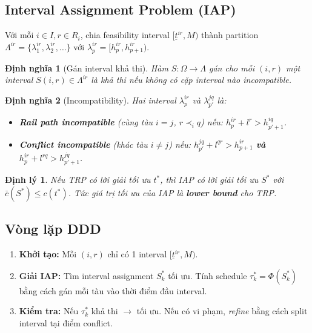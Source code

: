 \documentclass[11pt,a4paper]{article}
\newtheorem{definition}{Định nghĩa}
\newtheorem{theorem}{Định lý}
\begin{document}
\subsection{Interval Assignment Problem (IAP)}

Với mỗi $i \in I, r \in R_i$, chia feasibility interval $[\underline{t}^{ir}, M)$ thành partition $\Lambda^{ir} = \{\lambda_1^{ir}, \lambda_2^{ir}, \ldots\}$ với $\lambda_p^{ir} = [h_p^{ir}, h_{p+1}^{ir})$.

\begin{definition}[Gán interval khả thi]
Hàm $S: \Omega \to \Lambda$ gán cho mỗi $(i,r)$ một interval $S(i,r) \in \Lambda^{ir}$ là \emph{khả thi} nếu không có cặp interval nào incompatible.
\end{definition}

\begin{definition}[Incompatibility]
Hai interval $\lambda_p^{ir}$ và $\lambda_{p'}^{jq}$ là:
\begin{itemize}
  \item \textbf{Rail path incompatible} (cùng tàu $i=j$, $r \prec_i q$) nếu: $h_p^{ir} + l^r > h_{p'+1}^{iq}$.
  \item \textbf{Conflict incompatible} (khác tàu $i \neq j$) nếu: $h_{p'}^{jq} + l^{qr} > h_{p+1}^{ir}$ \textbf{và} $h_p^{ir} + l^{rq} > h_{p'+1}^{jq}$.
\end{itemize}
\end{definition}

\begin{theorem}
Nếu TRP có lời giải tối ưu $t^*$, thì IAP có lời giải tối ưu $S^*$ với $\bar{c}(S^*) \leq c(t^*)$. Tức giá trị tối ưu của IAP là \textbf{lower bound} cho TRP.
\end{theorem}

\subsection{Vòng lặp DDD}

\begin{enumerate}
  \item \textbf{Khởi tạo:} Mỗi $(i,r)$ chỉ có 1 interval $[\underline{t}^{ir}, M)$.
  \item \textbf{Giải IAP:} Tìm interval assignment $S_k^*$ tối ưu. Tính schedule $\tau_k^* = \Phi(S_k^*)$ bằng cách gán mỗi tàu vào thời điểm đầu interval.
  \item \textbf{Kiểm tra:} Nếu $\tau_k^*$ khả thi $\to$ tối ưu. Nếu có vi phạm, \emph{refine} bằng cách split interval tại điểm conflict.
\end{enumerate}
\end{document}
